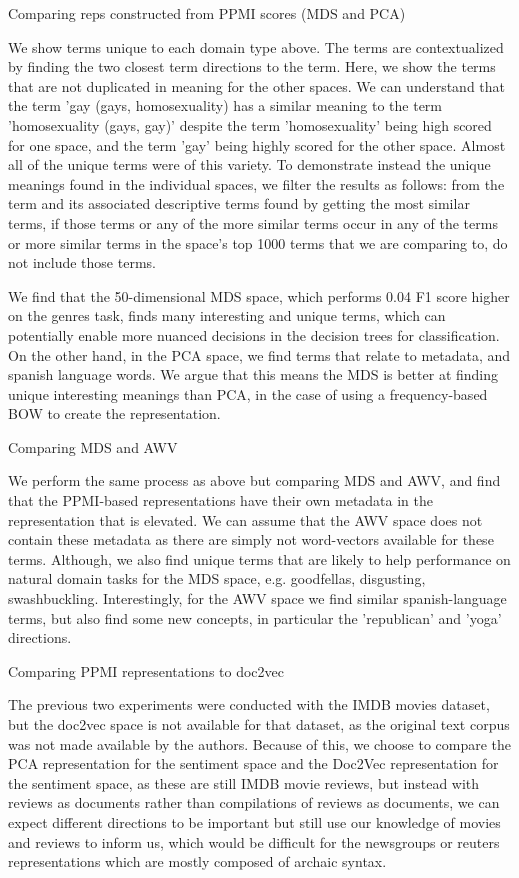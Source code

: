Comparing reps constructed from PPMI scores (MDS and PCA)

We show terms unique to each domain type above. The terms are contextualized by finding the two closest term directions to the term. Here, we show the terms that are not duplicated in meaning for the other spaces. We can understand that the term 'gay (gays, homosexuality) has a similar meaning to the term 'homosexuality (gays, gay)' despite the term 'homosexuality' being high scored for one space, and the term 'gay' being highly scored for the other space. Almost all of the unique terms were of this variety. To demonstrate instead the unique meanings found in the individual spaces, we filter the results as follows: from the term and its associated descriptive terms found by getting the most similar terms, if those terms or any of the more similar terms occur in any of the terms or more similar terms in the space's top 1000 terms that we are comparing to, do not include those terms.

We find that the 50-dimensional MDS space, which performs 0.04 F1 score higher on the genres task, finds many interesting and unique terms, which can potentially enable more nuanced decisions in the decision trees for classification. On the other hand, in the PCA space, we find terms that relate to metadata, and spanish language words. We argue that this means the MDS is better at finding unique interesting meanings than PCA, in the case of using a frequency-based BOW to create the representation.

Comparing MDS and AWV

We perform the same process as above but comparing MDS and AWV, and find that the PPMI-based representations have their own metadata in the representation that is elevated. We can assume that the AWV space does not contain these metadata as there are simply not word-vectors available for these terms. Although, we also find unique terms that are likely to help performance on natural domain tasks for the MDS space, e.g. goodfellas, disgusting, swashbuckling. Interestingly, for the AWV space we find similar spanish-language terms, but also find some new concepts, in particular the 'republican' and 'yoga' directions.

Comparing PPMI representations to doc2vec

The previous two experiments were conducted with the IMDB movies dataset, but the doc2vec space is not available for that dataset, as the original text corpus was not made available by the authors. Because of this, we choose to compare the PCA representation for the sentiment space and the Doc2Vec representation for the sentiment space, as these are still IMDB movie reviews, but instead with reviews as documents rather than compilations of reviews as documents, we can expect different directions to be important but still use our knowledge of movies and reviews to inform us, which would be difficult for the newsgroups or reuters representations which are mostly composed of archaic syntax. 

